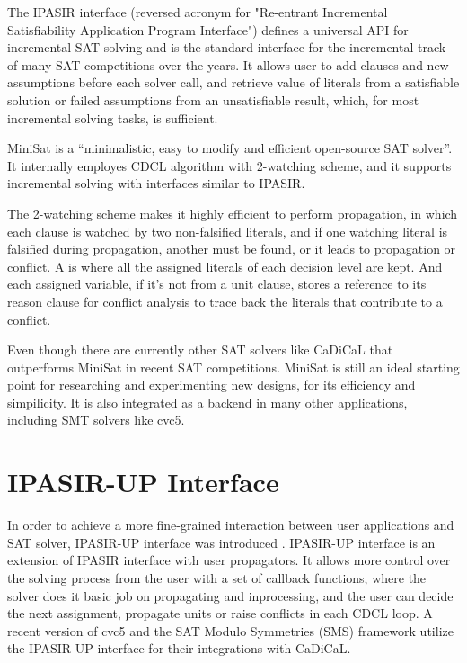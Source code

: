 The IPASIR interface (reversed acronym for "Re-entrant Incremental Satisfiability Application Program Interface") defines a universal API for incremental SAT solving and is the standard interface for the incremental track of many SAT competitions over the years. \cite{BALYO201645} It allows user to add clauses and new assumptions before each solver call, and retrieve value of literals from a satisfiable solution or failed assumptions from an unsatisfiable result, which, for most incremental solving tasks, is sufficient.

MiniSat is a ``minimalistic, easy to modify and efficient open-source SAT solver''. It internally employes CDCL algorithm with 2-watching scheme, and it supports incremental solving with interfaces similar to IPASIR.

The 2-watching scheme makes it highly efficient to perform propagation, in which each clause is watched by two non-falsified literals, and if one watching literal is falsified during propagation, another must be found, or it leads to propagation or conflict. A  is where all the assigned literals of each decision level are kept. And each assigned variable, if it's not from a unit clause, stores a reference to its reason clause for conflict analysis to trace back the literals that contribute to a conflict.

Even though there are currently other SAT solvers like CaDiCaL that outperforms MiniSat in recent SAT competitions. MiniSat is still an ideal starting point for researching and experimenting new designs, for its efficiency and simpilicity. It is also integrated as a backend in many other applications, including SMT solvers like cvc5.

\section{IPASIR-UP Interface}

In order to achieve a more fine-grained interaction between user applications and SAT solver, IPASIR-UP interface was introduced \cite{fazekas_et_al:LIPIcs.SAT.2023.8}. IPASIR-UP interface is an extension of IPASIR interface with user propagators. It allows more control over the solving process from the user with a set of callback functions, where the solver does it basic job on propagating and inprocessing, and the user can decide the next assignment, propagate units or raise conflicts in each CDCL loop. A recent version of cvc5 and the SAT Modulo Symmetries (SMS) framework utilize the IPASIR-UP interface for their integrations with CaDiCaL.

